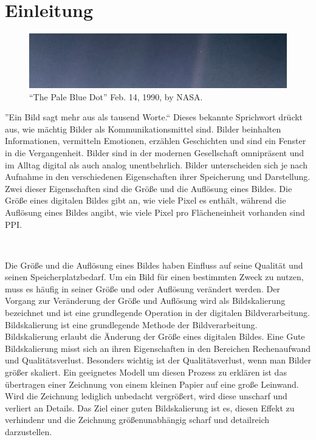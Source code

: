 



\chapter{Einleitung}

\begin{center}
\begin{figure}[h]
    \includegraphics[width=\textwidth]{img/PIA23645_PaleBlueDotRevisited_1600.jpg}
    \caption{``The Pale Blue Dot'' Feb. 14, 1990, by NASA\footnotemark.}
    \vspace{-6mm}
    \label{fig:my_label}
\end{figure}
\end{center}

''Ein Bild sagt mehr aus als tausend Worte.`` Dieses bekannte Sprichwort drückt aus, wie mächtig Bilder als Kommunikationsmittel sind. 
Bilder beinhalten Informationen, vermitteln Emotionen, erzählen Geschichten und sind ein Fenster in die Vergangenheit. 
Bilder sind in der modernen Gesellschaft omnipräsent und im Alltag digital als auch analog unentbehrlich.
Bilder unterscheiden sich je nach Aufnahme in den verschiedenen Eigenschaften ihrer Speicherung und Darstellung. 
Zwei dieser Eigenschaften sind die Größe und die Auflösung eines Bildes. 
Die Größe eines digitalen Bildes gibt an, wie viele Pixel es enthält, während die Auflösung eines Bildes angibt, wie viele Pixel pro Flächeneinheit vorhanden sind \ac{PPI}.

~

Die Größe und die Auflösung eines Bildes haben Einfluss auf seine Qualität und seinen Speicherplatzbedarf. 
Um ein Bild für einen bestimmten Zweck zu nutzen, muss es häufig in seiner Größe und oder Auflösung verändert werden. 
Der Vorgang zur Veränderung der Größe und Auflösung wird als Bildskalierung bezeichnet und ist eine grundlegende Operation in der digitalen Bildverarbeitung.
Bildskalierung ist eine grundlegende Methode der Bildverarbeitung. Bildskalierung erlaubt die Änderung der Größe eines digitalen Bildes.
Eine Gute Bildskalierung misst sich an ihren Eigenschaften in den Bereichen Rechenaufwand und Qualitätsverlust. 
Besonders wichtig ist der Qualitätsverlust, wenn man Bilder größer skaliert. 
Ein geeignetes Modell um diesen Prozess zu erklären ist das übertragen einer Zeichnung von einem kleinen Papier auf eine große Leinwand. 
Wird die Zeichnung lediglich unbedacht vergrößert, wird diese unscharf und verliert an Details. 
Das Ziel einer guten Bildskalierung ist es, diesen Effekt zu verhindenr und die Zeichnung größenunabhängig scharf und detailreich darzustellen.

